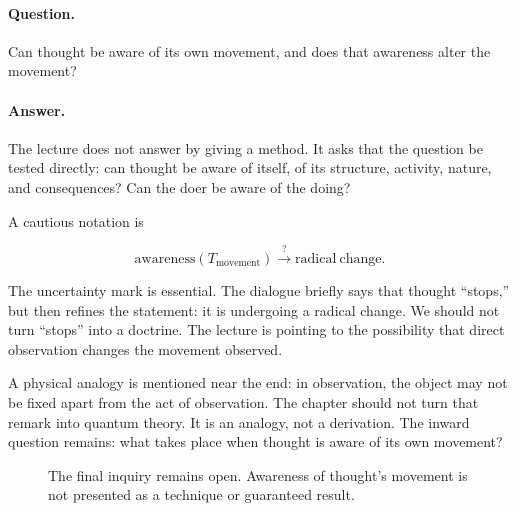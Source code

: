 \paragraph{Question.}
Can thought be aware of its own movement, and does that awareness alter the movement?

\paragraph{Answer.}
The lecture does not answer by giving a method. It asks that the question be tested directly: can thought be aware of itself, of its structure, activity, nature, and consequences? Can the doer be aware of the doing?

A cautious notation is

\begin{equation}
\mathrm{awareness}\!\left(T_{\mathrm{movement}}\right)
\overset{?}{\longrightarrow}
\mathrm{radical\ change}.
\end{equation}

The uncertainty mark is essential. The dialogue briefly says that thought ``stops,'' but then refines the statement: it is undergoing a radical change. We should not turn ``stops'' into a doctrine. The lecture is pointing to the possibility that direct observation changes the movement observed.

A physical analogy is mentioned near the end: in observation, the object may not be fixed apart from the act of observation. The chapter should not turn that remark into quantum theory. It is an analogy, not a derivation. The inward question remains: what takes place when thought is aware of its own movement?

\begin{figure}
\centering
{}
\caption{The final inquiry remains open. Awareness of thought's movement is not presented as a technique or guaranteed result.}
\end{figure}

